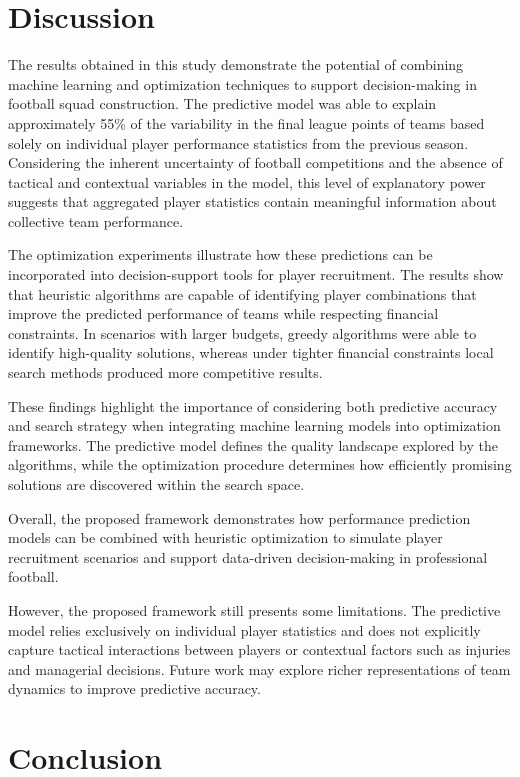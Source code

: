 \documentclass[a4paper,fleqn]{cas-sc}
\begin{document}
\section{Discussion}

The results obtained in this study demonstrate the potential of combining machine learning and optimization techniques to support decision-making
in football squad construction. The predictive model was able to explain approximately 55\% of the variability in the final league points of teams
based solely on individual player performance statistics from the previous season. Considering the inherent uncertainty of football
competitions and the absence of tactical and contextual variables in the model, this level of explanatory power suggests that aggregated player
statistics contain meaningful information about collective team performance.

The optimization experiments illustrate how these predictions can be incorporated into decision-support tools for player recruitment.
The results show that heuristic algorithms are capable of identifying player combinations that improve the predicted performance of teams
while respecting financial constraints. In scenarios with larger budgets, greedy algorithms were able to identify high-quality
solutions, whereas under tighter financial constraints local search methods produced more competitive results.

These findings highlight the importance of considering both predictive accuracy and search strategy when integrating machine learning models
into optimization frameworks. The predictive model defines the quality landscape explored by the algorithms, while the optimization procedure
determines how efficiently promising solutions are discovered within the search space.

Overall, the proposed framework demonstrates how performance prediction models can be combined with heuristic optimization to simulate player
recruitment scenarios and support data-driven decision-making in professional football.

However, the proposed framework still presents some limitations. The predictive model relies exclusively on individual player statistics and
does not explicitly capture tactical interactions between players or contextual factors such as injuries and managerial decisions. Future work may explore
richer representations of team dynamics to improve predictive accuracy.

\section{Conclusion}
\end{document}
